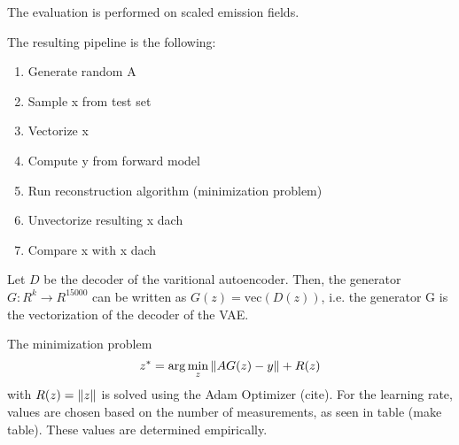 The evaluation is performed on scaled emission fields.

The resulting pipeline is the following:
\begin{enumerate}
    \item Generate random A
    \item Sample x from test set
    \item Vectorize x
    \item Compute y from forward model
    \item Run reconstruction algorithm (minimization problem)
    \item Unvectorize resulting x dach
    \item Compare x with x dach
\end{enumerate}

Let $D$ be the decoder of the varitional autoencoder.
Then, the generator $G: R^k \rightarrow R^{15000}$ can be written as $G(z) = \text{vec}(D(z))$, i.e. the generator G is the vectorization of the decoder of the VAE.

The minimization problem
\begin{equation}
    z^* = \arg\min_{z}{\left\lVert A G(z) - y\right\rVert + R(z)}
\end{equation}
with $R(z) = \left\lVert z\right\rVert$ is solved using the Adam Optimizer (cite).
For the learning rate, values are chosen based on the number of measurements, as seen in table (make table).
These values are determined empirically.

